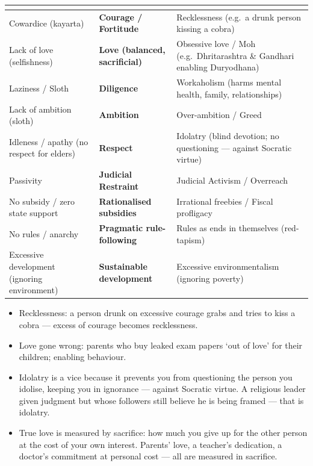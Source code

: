 \begin{tabularx}{\textwidth}{@{}Y >{\bfseries\color{Accent}}p{3.1cm} Y@{}}
\toprule
{} &  &  \\
\midrule
Cowardice (kayarta) & Courage / Fortitude & Recklessness (e.g.\ a drunk person kissing a cobra) \\
Lack of love (selfishness) & Love (balanced, sacrificial) & Obsessive love / Moh (e.g.\ Dhritarashtra \& Gandhari enabling Duryodhana) \\
Laziness / Sloth & Diligence & Workaholism (harms mental health, family, relationships) \\
Lack of ambition (sloth) & Ambition & Over-ambition / Greed \\
Idleness / apathy (no respect for elders) & Respect & Idolatry (blind devotion; no questioning --- against Socratic virtue) \\
Passivity & Judicial Restraint & Judicial Activism / Overreach \\
No subsidy / zero state support & Rationalised subsidies & Irrational freebies / Fiscal profligacy \\
No rules / anarchy & Pragmatic rule-following & Rules as ends in themselves (red-tapism) \\
Excessive development (ignoring environment) & Sustainable development & Excessive environmentalism (ignoring poverty) \\
\bottomrule
\end{tabularx}

\begin{ExampleBox}
\begin{itemize}
\item Recklessness: a person drunk on excessive courage grabs and tries to kiss a cobra --- excess of courage becomes recklessness.
\item Love gone wrong: parents who buy leaked exam papers `out of love' for their children; enabling behaviour.
\item Idolatry is a vice because it prevents you from questioning the person you idolise, keeping you in ignorance --- against Socratic virtue. A religious leader given judgment but whose followers still believe he is being framed --- that is idolatry.
\item True love is measured by sacrifice: how much you give up for the other person at the cost of your own interest. Parents' love, a teacher's dedication, a doctor's commitment at personal cost --- all are measured in sacrifice.
\end{itemize}
\end{ExampleBox}

